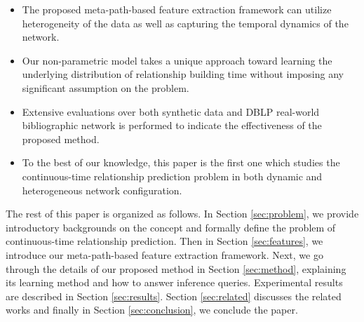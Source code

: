 \begin{itemize}
\item The proposed meta-path-based feature extraction framework can utilize heterogeneity of the data as well as capturing the temporal dynamics of the network.
\item Our non-parametric model takes a unique approach toward learning the underlying distribution of relationship building time without imposing any significant assumption on the problem.
\item Extensive evaluations over both synthetic data and DBLP real-world bibliographic network is performed to indicate the effectiveness of the proposed method. 
\item To the best of our knowledge, this paper is the first one which studies the continuous-time relationship prediction problem in both dynamic and heterogeneous network configuration.
\end{itemize}

The rest of this paper is organized as follows. In Section \ref{sec:problem}, we provide introductory backgrounds on the concept and formally define the problem of continuous-time relationship prediction. Then in Section \ref{sec:features}, we introduce our meta-path-based feature extraction framework. Next, we go through the details of our proposed \npglm method in Section \ref{sec:method}, explaining its learning method and how to answer inference queries. Experimental results are described in Section \ref{sec:results}. Section \ref{sec:related} discusses the related works and finally in Section \ref{sec:conclusion}, we conclude the paper.
